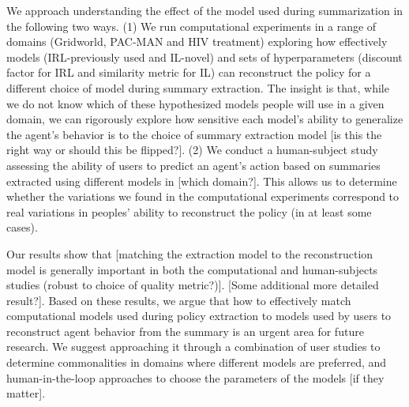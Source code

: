\documentclass{article}
\begin{document}
We approach understanding the effect of the model used during summarization in the following two ways.  (1) We run computational experiments in a range of domains (Gridworld, PAC-MAN and HIV treatment) exploring how effectively models (IRL-previously used and IL-novel) and sets of hyperparameters (discount factor for IRL and similarity metric for IL) can reconstruct the policy for a different choice of model during summary extraction.  The insight is that, while we do not know which of these hypothesized models people will use in a given domain, we can rigorously explore how sensitive each model's ability to generalize the agent's behavior is to the choice of summary extraction model [is this the right way or should this be flipped?].  (2) We conduct a human-subject study assessing the ability of users to predict an agent's action based on summaries extracted using different models in [which domain?].  This allows us to determine whether the variations we found in the computational experiments correspond to real variations in peoples' ability to reconstruct the policy (in at least some cases).  

Our results show that [matching the extraction model to the reconstruction model is generally important in both the computational and human-subjects studies (robust to choice of quality metric?)].  [Some additional more detailed result?].  Based on these results, we argue that how to effectively match computational models used during policy extraction to models used by users to reconstruct agent behavior from the summary is an urgent area for future research.  We suggest approaching it through a combination of user studies to determine commonalities in domains where different models are preferred, and human-in-the-loop approaches to choose the parameters of the models [if they matter].



\end{document}
